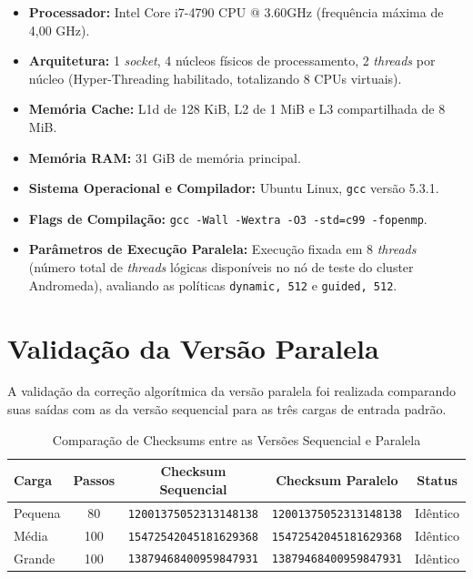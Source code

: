 \documentclass[a4paper,12pt]{article}
\begin{document}
\begin{itemize}
    \item \textbf{Processador:} Intel\textregistered{} Core\texttrademark{} i7-4790 CPU @ 3.60GHz (frequência máxima de 4,00 GHz).
    \item \textbf{Arquitetura:} 1 \textit{socket}, 4 núcleos físicos de processamento, 2 \textit{threads} por núcleo (Hyper-Threading habilitado, totalizando 8 CPUs virtuais).
    \item \textbf{Memória Cache:} L1d de 128 KiB, L2 de 1 MiB e L3 compartilhada de 8 MiB.
    \item \textbf{Memória RAM:} 31 GiB de memória principal.
    \item \textbf{Sistema Operacional e Compilador:} Ubuntu Linux, \texttt{gcc} versão 5.3.1.
    \item \textbf{Flags de Compilação:} \texttt{gcc -Wall -Wextra -O3 -std=c99 -fopenmp}.
    \item \textbf{Parâmetros de Execução Paralela:} Execução fixada em 8 \textit{threads} (número total de \textit{threads} lógicas disponíveis no nó de teste do cluster Andromeda), avaliando as políticas \texttt{dynamic, 512} e \texttt{guided, 512}.
\end{itemize}

\section{Validação da Versão Paralela}

A validação da correção algorítmica da versão paralela foi realizada comparando suas saídas com as da versão sequencial para as três cargas de entrada padrão.

\begin{table}[htbp]
\centering
\caption{Comparação de Checksums entre as Versões Sequencial e Paralela}
\label{tab:validacao}
\vspace{0.2cm}

\begin{tabular}{lcccc}
\toprule
\textbf{Carga} & \textbf{Passos} & \textbf{Checksum Sequencial} & \textbf{Checksum Paralelo} & \textbf{Status} \\ \midrule
Pequena & 80  & \texttt{12001375052313148138} & \texttt{12001375052313148138} & Idêntico \\
Média   & 100 & \texttt{15472542045181629368} & \texttt{15472542045181629368} & Idêntico \\
Grande  & 100 & \texttt{13879468400959847931} & \texttt{13879468400959847931} & Idêntico \\ \bottomrule
\end{tabular}
\end{table}
\end{document}
